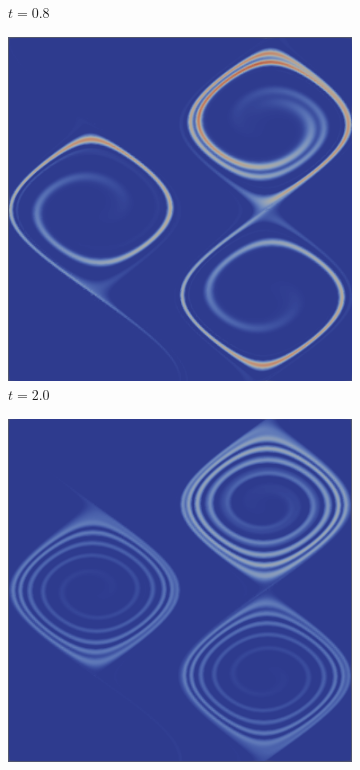 \documentclass[a4paper,10pt]{article}
\begin{document}
\begin{figure}[!htb]
\begin{subfigure}[b]{0.3\textwidth}
    \caption{$t = 0.8$}
  \end{subfigure}
   \begin{subfigure}[b]{0.3\textwidth}
    \includegraphics[width=\textwidth]{./figures/solution.0020.png}
    \caption{$t = 2.0$}
  \end{subfigure}
  \begin{subfigure}[b]{0.3\textwidth}
    \includegraphics[width=\textwidth]{./figures/solution.0070.png}

\end{subfigure}
\end{figure}
\end{document}
